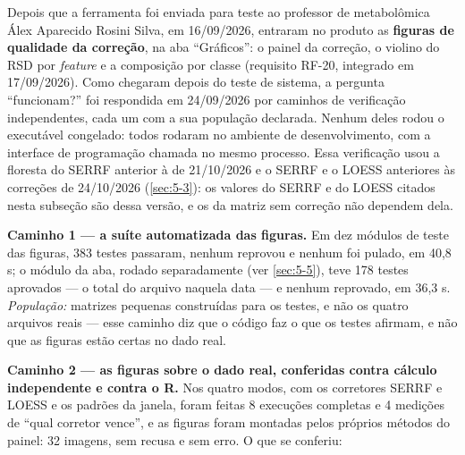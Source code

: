 Depois que a ferramenta foi enviada para teste ao professor de metabolômica Álex Aparecido Rosini Silva, em 16/09/2026, entraram no produto as \textbf{figuras de qualidade da correção}, na aba ``Gráficos'': o painel da correção, o violino do RSD por \textit{feature} e a composição por classe (requisito RF-20, integrado em 17/09/2026). Como chegaram depois do teste de sistema, a pergunta ``funcionam?'' foi respondida em 24/09/2026 por caminhos de verificação independentes, cada um com a sua população declarada. Nenhum deles rodou o executável congelado: todos rodaram no ambiente de desenvolvimento, com a interface de programação chamada no mesmo processo. Essa verificação usou a floresta do SERRF anterior à de 21/10/2026 e o SERRF e o LOESS anteriores às correções de 24/10/2026 (\ref{sec:5-3}): os valores do SERRF e do LOESS citados nesta subseção são dessa versão, e os da matriz sem correção não dependem dela.


\textbf{Caminho 1 --- a suíte automatizada das figuras.} Em dez módulos de teste das figuras, 383 testes passaram, nenhum reprovou e nenhum foi pulado, em 40,8 s; o módulo da aba, rodado separadamente (ver \ref{sec:5-5}), teve 178 testes aprovados --- o total do arquivo naquela data --- e nenhum reprovado, em 36,3 s. \textit{População:} matrizes pequenas construídas para os testes, e não os quatro arquivos reais --- esse caminho diz que o código faz o que os testes afirmam, e não que as figuras estão certas no dado real.

\textbf{Caminho 2 --- as figuras sobre o dado real, conferidas contra cálculo independente e contra o R.} Nos quatro modos, com os corretores SERRF e LOESS e os padrões da janela, foram feitas 8 execuções completas e 4 medições de ``qual corretor vence'', e as figuras foram montadas pelos próprios métodos do painel: 32 imagens, sem recusa e sem erro. O que se conferiu:

